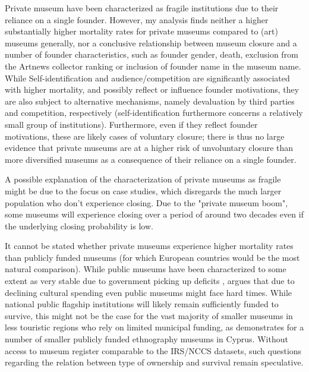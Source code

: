 \documentclass[12pt]{article}
\begin{document}
Private museum have been characterized as fragile institutions due to their reliance on a single founder.
However, my analysis finds neither a higher substantially higher mortality rates for private museums compared to (art) museums generally, nor a conclusive relationship between museum closure and a number of founder characteristics, such as founder gender, death, exclusion from the Artnews collector ranking or inclusion of founder name in the museum name.
While Self-identification and audience/competition are significantly associated with higher mortality, and possibly reflect or influence founder motivations, they are also subject to alternative mechanisms, namely devaluation by third parties and competition, respectively (self-identification furthermore concerns a relatively small group of institutions).
Furthermore, even if they reflect founder motivations, these are likely cases of voluntary closure; there is thus no large evidence that private museums are at a higher risk of unvoluntary closure than more diversified museums as a consequence of their reliance on a single founder. 



A possible explanation of the characterization of private museums as fragile might be due to the focus on case studies, which disregards the much larger population who don't experience closing.
Due to the "private museum boom", some museums will experience closing over a period of around two decades even if the underlying closing probability is low.





It cannot be stated whether private museums experience higher mortality rates than publicly funded museums (for which European countries would be the most natural comparison).
While public museums have been characterized to some extent as very stable due to government picking up deficits \parencite{Meier_Frey_2003_faces,Bechtler_Imhof_2018_future}, \textcite{Walker_2019_collector} argues that due to declining cultural spending even public museums might face hard times.
While national public flagship institutions will likely remain sufficiently funded to survive, this might not be the case for the vast majority of smaller museums in less touristic regions who rely on limited municipal funding, as \textcite{StylianouLambert_etal_2014_museums} demonstrates for a number of smaller publicly funded ethnography museums in Cyprus.
Without access to museum register comparable to the IRS/NCCS datasets, such questions regarding the relation between type of ownership and survival remain speculative.
\end{document}
